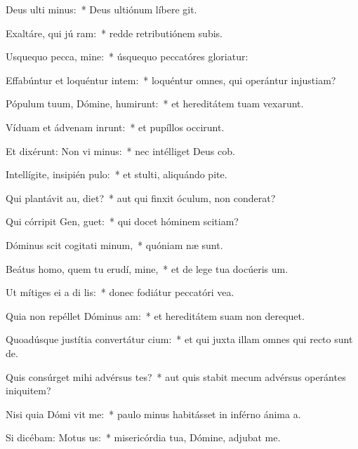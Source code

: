 \item Deus ulti minus:~* Deus ultiónum líbere git.
\item Exaltáre, qui jú ram:~* redde retributiónem subis.
\item Usquequo pecca, mine:~* úsquequo peccatóres gloriatur:
\item Effabúntur et loquéntur intem:~* loquéntur omnes, qui operántur injustiam?
\item Pópulum tuum, Dómine, humirunt:~* et hereditátem tuam vexarunt.
\item Víduam et ádvenam inrunt:~* et pupíllos occirunt.
\item Et dixérunt: Non vi minus:~* nec intélliget Deus cob.
\item Intellígite, insipién  pulo:~* et stulti, aliquándo pite.
\item Qui plantávit au,  diet?~* aut qui finxit óculum, non conderat?
\item Qui córripit Gen,  guet:~* qui docet hóminem scitiam?
\item Dóminus scit cogitati minum,~* quóniam næ sunt.
\item Beátus homo, quem tu erudí, mine,~* et de lege tua docúeris um.
\item Ut mítiges ei a di lis:~* donec fodiátur peccatóri vea.
\item Quia non repéllet Dóminus  am:~* et hereditátem suam non derequet.
\item Quoadúsque justítia convertátur  cium:~* et qui juxta illam omnes qui recto sunt de.
\item Quis consúrget mihi advérsus tes?~* aut quis stabit mecum advérsus operántes iniquitem?
\item Nisi quia Dómi vit me:~* paulo minus habitásset in inférno ánima a.
\item Si dicébam: Motus   us:~* misericórdia tua, Dómine, adjubat me.
